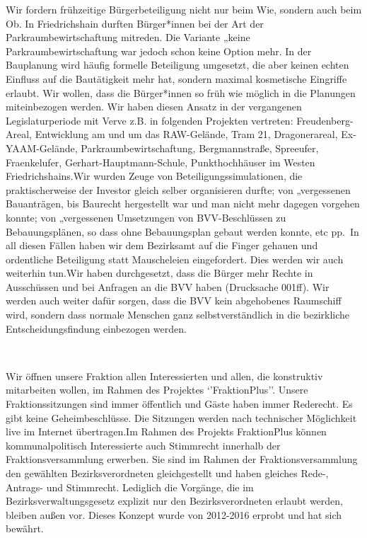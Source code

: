 \documentclass[a4paper,10pt]{article}
\newcommand{\mysection}[1]{{\vspace{1cm}\noindent\color{gray}{\ttfamily\LARGE\raggedright #1}\\\medskip}}
\begin{document}
Wir fordern frühzeitige Bürgerbeteiligung nicht nur beim Wie, sondern
auch beim Ob. In Friedrichshain durften Bürger*innen bei der Art
der Parkraumbewirtschaftung mitreden. Die Variante „keine
Parkraumbewirtschaftung{\grqq} war jedoch schon keine Option mehr. In der
Bauplanung wird häufig formelle Beteiligung umgesetzt, die aber keinen
echten Einfluss auf die Bautätigkeit mehr hat, sondern maximal
kosmetische Eingriffe erlaubt. Wir wollen, dass die Bürger*innen so früh
wie möglich in die Planungen miteinbezogen werden. Wir haben diesen
Ansatz in der vergangenen Legislaturperiode mit Verve z.B. in folgenden
Projekten vertreten: Freudenberg-Areal, Entwicklung am und um das
RAW-Gelände, Tram 21, Dragonerareal, Ex-YAAM-Gelände,
Parkraumbewirtschaftung, Bergmannstraße, Spreeufer, Fraenkelufer,
Gerhart-Hauptmann-Schule, Punkthochhäuser im Westen Friedrichshains.Wir
wurden Zeuge von Beteiligungssimulationen, die praktischerweise der
Investor gleich selber organisieren durfte; von „vergessenen{\grqq}
Bauanträgen, bis Baurecht hergestellt war und man nicht mehr dagegen
vorgehen konnte; von „vergessenen{\grqq} Umsetzungen von BVV-Beschlüssen zu
Bebauungsplänen, so dass ohne Bebauungsplan gebaut werden konnte, etc
pp.~In all diesen Fällen haben wir dem Bezirksamt auf die Finger gehauen
und ordentliche Beteiligung statt Mauscheleien eingefordert. Dies werden
wir auch weiterhin tun.Wir haben durchgesetzt, dass die Bürger mehr
Rechte in Ausschüssen und bei Anfragen an die BVV haben (Drucksache
001ff). Wir werden auch weiter dafür sorgen, dass die BVV kein
\enlargethispage{-1em}
abgehobenes Raumschiff wird, sondern dass normale Menschen ganz
selbstverständlich in die bezirkliche Entscheidungsfindung einbezogen
werden.

\mysection{FraktionPlus}

Wir öffnen unsere Fraktion allen Interessierten und allen, die
konstruktiv mitarbeiten wollen, im Rahmen des Projektes
`'FraktionPlus''. Unsere Fraktionssitzungen sind immer öffentlich und
Gäste haben immer Rederecht. Es gibt keine Geheimbeschlüsse. Die
Sitzungen werden nach technischer Möglichkeit live im Internet
übertragen.Im Rahmen des Projekts FraktionPlus können kommunalpolitisch
Interessierte auch Stimmrecht innerhalb der Fraktionsversammlung
erwerben. Sie sind im Rahmen der Fraktionsversammlung den gewählten
Bezirksverordneten gleichgestellt und haben gleiches Rede-, Antrags- und
Stimmrecht. Lediglich die Vorgänge, die im Bezirksverwaltungsgesetz
explizit nur den Bezirksverordneten erlaubt werden, bleiben außen vor.
Dieses Konzept wurde von 2012-2016 erprobt und hat sich bewährt.
\end{document}
